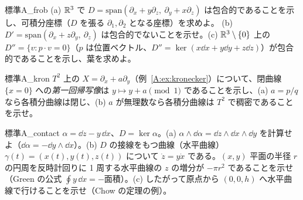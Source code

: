 \begin{probl}{標準}{A_frob}
(a) $\mathbb R^3$ で $D=\mathrm{span}(\partial_x+y\partial_z,\ \partial_y+x\partial_z)$ は包合的であることを示し、可積分座標（$D$ を張る $\partial_1,\partial_2$ となる座標）を求めよ。 (b) $D'=\mathrm{span}(\partial_x+z\partial_y,\ \partial_z)$ は包合的でないことを示せ。(c) $\mathbb R^3\setminus\{0\}$ 上の $D''=\{v:p\cdot v=0\}$（$p$ は位置ベクトル、$D''=\ker(x\dd x+y\dd y+z\dd z)$）が包合的であることを示し、葉を求めよ。
\end{probl}

\begin{probl}{標準}{A_kron}
$T^2$ 上の $X=\partial_x+a\partial_y$（例~\ref{A:ex:kronecker}）について、閉曲線 $\{x=0\}$ への\emph{第一回帰写像}は $y\mapsto y+a\pmod1$ であることを示し、(a) $a=p/q$ なら各積分曲線は閉じ、(b) $a$ が無理数なら各積分曲線は $T^2$ で稠密であることを示せ。
\end{probl}

\begin{probl}{標準}{A_contact}
$\alpha=\dd z-y\,\dd x$、$D=\ker\alpha$。(a) $\alpha\wedge\dd\alpha=\dd z\wedge\dd x\wedge\dd y$ を計算せよ（$\dd\alpha=-\dd y\wedge\dd x$）。(b) $D$ の接線をもつ曲線（水平曲線）$\gamma(t)=(x(t),y(t),z(t))$ について $\dot z=y\dot x$ である。$(x,y)$ 平面の半径 $r$ の円周を反時計回りに 1 周する水平曲線の $z$ の増分が $-\pi r^2$ であることを示せ（Green の公式 $\oint y\,\dd x=-\mathrm{面積}$）。(c) したがって原点から $(0,0,h)$ へ水平曲線で行けることを示せ（Chow の定理の例）。
\end{probl}
